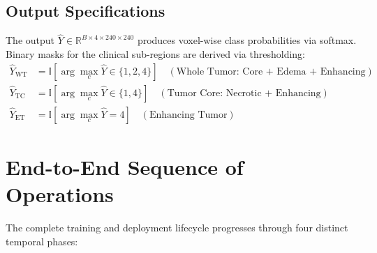 \documentclass[10pt,a4paper]{article}
\begin{document}
\subsection{Output Specifications}
The output $\hat{Y} \in \mathbb{R}^{B \times 4 \times 240 \times 240}$ produces voxel-wise class probabilities via softmax. Binary masks for the clinical sub-regions are derived via thresholding:
\begin{align}
    \hat{Y}_{\text{WT}} &= \mathbb{I}\left[\arg\max_c \hat{Y} \in \{1, 2, 4\}\right] \quad (\text{Whole Tumor: Core + Edema + Enhancing}) \\
    \hat{Y}_{\text{TC}} &= \mathbb{I}\left[\arg\max_c \hat{Y} \in \{1, 4\}\right] \quad (\text{Tumor Core: Necrotic + Enhancing}) \\
    \hat{Y}_{\text{ET}} &= \mathbb{I}\left[\arg\max_c \hat{Y} = 4\right] \quad (\text{Enhancing Tumor})
\end{align}

\section{End-to-End Sequence of Operations}

The complete training and deployment lifecycle progresses through four distinct temporal phases:
\end{document}
